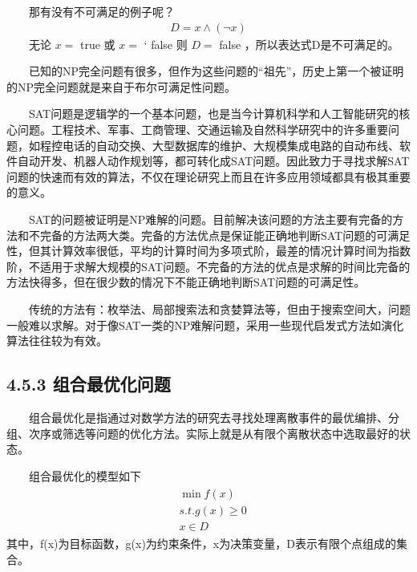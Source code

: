 \documentclass[a4paper,11pt,english]{sphinxmanual}
\begin{document}
\sphinxAtStartPar
  那有没有不可满足的例子呢？
\begin{equation*}
\begin{split}D=x \wedge(\neg x)\end{split}
\end{equation*}
\sphinxAtStartPar
  无论  \(x=\) true 或  \(x=\) ` false 则  \(D=\) false ，所以表达式D是不可满足的。

\sphinxAtStartPar
  已知的NP\sphinxhyphen{}完全问题有很多，但作为这些问题的“祖先”，历史上第一个被证明的NP\sphinxhyphen{}完全问题就是来自于布尔可满足性问题。

\sphinxAtStartPar
  SAT问题是逻辑学的一个基本问题，也是当今计算机科学和人工智能研究的核心问题。工程技术、军事、工商管理、交通运输及自然科学研究中的许多重要问题，如程控电话的自动交换、大型数据库的维护、大规模集成电路的自动布线、软件自动开发、机器人动作规划等，都可转化成SAT问题。因此致力于寻找求解SAT问题的快速而有效的算法，不仅在理论研究上而且在许多应用领域都具有极其重要的意义。

\sphinxAtStartPar
  SAT的问题被证明是NP难解的问题。目前解决该问题的方法主要有完备的方法和不完备的方法两大类。完备的方法优点是保证能正确地判断SAT问题的可满足性，但其计算效率很低，平均的计算时间为多项式阶，最差的情况计算时间为指数阶，不适用于求解大规模的SAT问题。不完备的方法的优点是求解的时间比完备的方法快得多，但在很少数的情况下不能正确地判断SAT问题的可满足性。

\sphinxAtStartPar
  传统的方法有：枚举法、局部搜索法和贪婪算法等，但由于搜索空间大，问题一般难以求解。对于像SAT一类的NP难解问题，采用一些现代启发式方法如演化算法往往较为有效。


\subsection{4.5.3 组合最优化问题}
\label{\detokenize{rst/4.5QAOA_u7b97_u6cd5:id3}}
\sphinxAtStartPar
  组合最优化是指通过对数学方法的研究去寻找处理离散事件的最优编排、分组、次序或筛选等问题的优化方法。实际上就是从有限个离散状态中选取最好的状态。

\sphinxAtStartPar
  组合最优化的模型如下
\begin{equation*}
\begin{split}\begin{aligned} &\min f(x) \\ &s.t. g(x) \geq 0 \\ &x \in D \end{aligned}\end{split}
\end{equation*}
\sphinxAtStartPar
其中，f(x)为目标函数，g(x)为约束条件，x为决策变量，D表示有限个点组成的集合。
\end{document}
